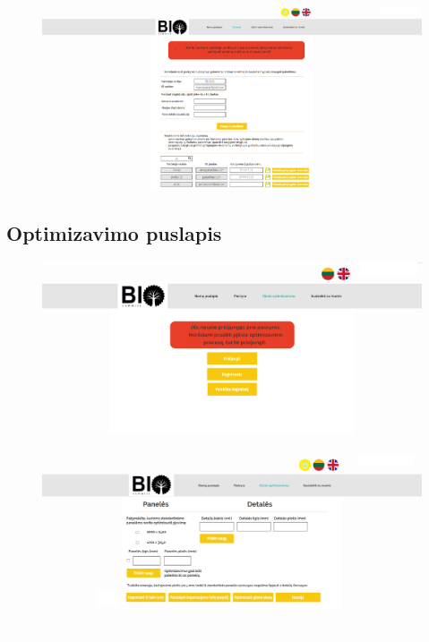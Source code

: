 \documentclass[a4paper,12pt]{article}
\begin{document}
\clearpage

\begin{figure}[!tph]
\hspace{-3cm}
\centering
\includegraphics[scale=0.5]{interfeisai/paskyrosPuslapisAdministratoriusSuKlaida}
\label{fig:verticalcell}
\end{figure}



\clearpage

\subsection{Optimizavimo puslapis}
\begin{figure}[!tph]
\hspace{-3cm}
\centering
\includegraphics[scale=0.5]{interfeisai/optimizavimoPuslapisNeprisijungus}
\label{fig:verticalcell}
\end{figure}

\begin{figure}[!tph]
\hspace{-3cm}
\centering
\includegraphics[scale=0.5]{interfeisai/optimizavimoPuslapisPrisijungus}
\label{fig:verticalcell}
\end{figure}
\end{document}
